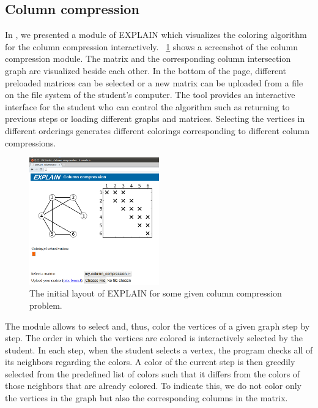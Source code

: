 \documentclass[12pt, twoside,a4paper,toc=bibliography]{scrbook}
\begin{document}
\subsection{Column compression}
\label{s.column-compression}
In \cite{2013:05,2014:01}, we presented a module of \mbox{EXPLAIN} which visualizes the
coloring algorithm for the column compression interactively.
\figurename~\ref{fig1} shows a screenshot of the column compression module.
The matrix and the corresponding column intersection graph are visualized beside each other.
In the bottom of the page, different preloaded matrices can be selected
or a new matrix can be uploaded from a file on the file system of the student's computer.
The tool provides an interactive interface for the student who can control the algorithm
such as returning to previous steps or loading different graphs and matrices.
Selecting the vertices in different orderings generates different colorings corresponding to different column compressions.

\begin{figure}
\centering
\includegraphics[width=0.5\textwidth]{fig1.png}
\caption{The initial layout of EXPLAIN for some given column compression problem.}
\label{fig1}
\end{figure}
The module allows to select and, thus, color the vertices of a given graph step by step. The order in which the vertices are colored is interactively selected by the student. In each step, when the student selects a vertex, the program checks all of its neighbors regarding the colors. A color of the current step is then greedily selected from the predefined list of colors such that it differs from the colors of those neighbors that are already colored.
To indicate this, we do not color only the vertices in the graph but also the corresponding columns in the matrix.
\end{document}
